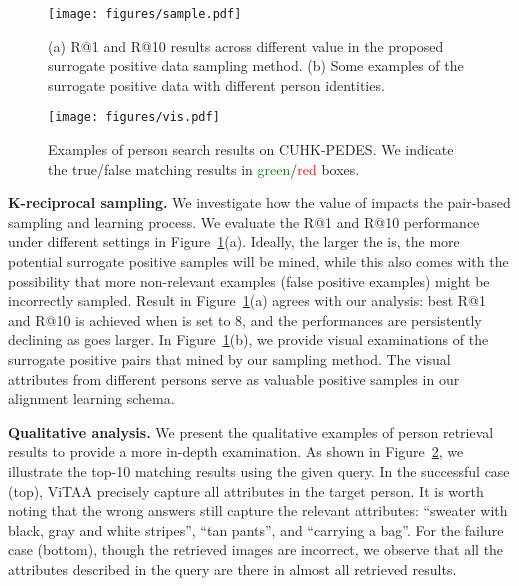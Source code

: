 \documentclass[runningheads]{llncs}
\begin{document}
\begin{figure}[t]
\centering
\texttt{[image: figures/sample.pdf]}
\caption{(a) R@1 and R@10 results across different  value in the proposed surrogate positive data sampling method. (b) Some examples of the surrogate positive data with different person identities.}
\label{fig:sample}
\end{figure}

\begin{figure}[t]
\centering
\texttt{[image: figures/vis.pdf]}
\caption{Examples of person search results on CUHK-PEDES. We indicate the true/false matching results in \textcolor{green}{green}/\textcolor{red}{red} boxes.}
\label{fig:visana}
\end{figure}

\noindent\textbf{K-reciprocal sampling.}
We investigate how the value of  impacts the pair-based sampling and learning process. We evaluate the R@1 and R@10 performance under different  settings in Figure~\ref{fig:sample}(a). Ideally, the larger the  is, the more potential surrogate positive samples will be mined, while this also comes with the possibility that more non-relevant examples (false positive examples) might be incorrectly sampled. Result in Figure~\ref{fig:sample}(a) agrees with our analysis: best R@1 and R@10 is achieved when  is set to 8, and the performances are persistently declining as  goes larger. In Figure~\ref{fig:sample}(b), we provide visual examinations of the surrogate positive pairs that mined by our sampling method. The visual attributes from different persons serve as valuable positive samples in our alignment learning schema.

\noindent\textbf{Qualitative analysis.}
We present the qualitative examples of person retrieval results to provide a more in-depth examination. As shown in Figure~\ref{fig:visana}, we illustrate the top-10 matching results using the given query. 
In the successful case (top), ViTAA precisely capture all attributes in the target person. It is worth noting that the wrong answers still capture the relevant attributes: ``sweater with black, gray and white stripes'', ``tan pants'', and ``carrying a bag''.
For the failure case (bottom), though the retrieved images are incorrect, we observe that all the attributes described in the query are there in almost all retrieved results.
\end{document}

